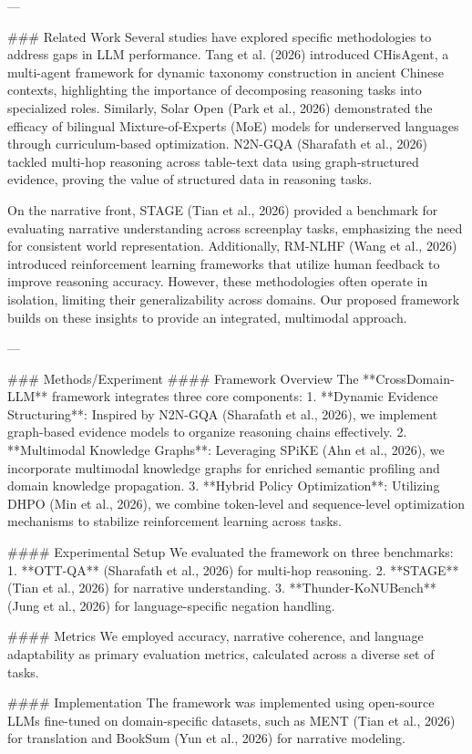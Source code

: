 ---

### Related Work
Several studies have explored specific methodologies to address gaps in LLM performance. Tang et al. (2026) introduced CHisAgent, a multi-agent framework for dynamic taxonomy construction in ancient Chinese contexts, highlighting the importance of decomposing reasoning tasks into specialized roles. Similarly, Solar Open (Park et al., 2026) demonstrated the efficacy of bilingual Mixture-of-Experts (MoE) models for underserved languages through curriculum-based optimization. N2N-GQA (Sharafath et al., 2026) tackled multi-hop reasoning across table-text data using graph-structured evidence, proving the value of structured data in reasoning tasks.

On the narrative front, STAGE (Tian et al., 2026) provided a benchmark for evaluating narrative understanding across screenplay tasks, emphasizing the need for consistent world representation. Additionally, RM-NLHF (Wang et al., 2026) introduced reinforcement learning frameworks that utilize human feedback to improve reasoning accuracy. However, these methodologies often operate in isolation, limiting their generalizability across domains. Our proposed framework builds on these insights to provide an integrated, multimodal approach.

---

### Methods/Experiment
#### Framework Overview
The **CrossDomain-LLM** framework integrates three core components:
1. **Dynamic Evidence Structuring**: Inspired by N2N-GQA (Sharafath et al., 2026), we implement graph-based evidence models to organize reasoning chains effectively.
2. **Multimodal Knowledge Graphs**: Leveraging SPiKE (Ahn et al., 2026), we incorporate multimodal knowledge graphs for enriched semantic profiling and domain knowledge propagation.
3. **Hybrid Policy Optimization**: Utilizing DHPO (Min et al., 2026), we combine token-level and sequence-level optimization mechanisms to stabilize reinforcement learning across tasks.

#### Experimental Setup
We evaluated the framework on three benchmarks:
1. **OTT-QA** (Sharafath et al., 2026) for multi-hop reasoning.
2. **STAGE** (Tian et al., 2026) for narrative understanding.
3. **Thunder-KoNUBench** (Jung et al., 2026) for language-specific negation handling.

#### Metrics
We employed accuracy, narrative coherence, and language adaptability as primary evaluation metrics, calculated across a diverse set of tasks.

#### Implementation
The framework was implemented using open-source LLMs fine-tuned on domain-specific datasets, such as MENT (Tian et al., 2026) for translation and BookSum (Yun et al., 2026) for narrative modeling.

